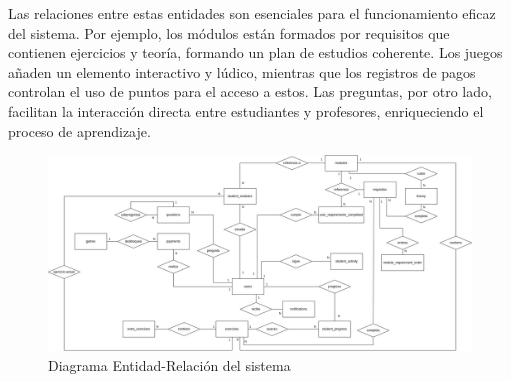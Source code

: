 Las relaciones entre estas entidades son esenciales para el funcionamiento eficaz del sistema. Por ejemplo, los módulos están formados por requisitos que contienen ejercicios y teoría, formando un plan de estudios coherente. Los juegos añaden un elemento interactivo y lúdico, mientras que los registros de pagos controlan el uso de puntos para el acceso a estos. Las preguntas, por otro lado, facilitan la interacción directa entre estudiantes y profesores, enriqueciendo el proceso de aprendizaje.

\begin{figure}[H]
    \centering
    \includegraphics[width=1.2\textwidth]{imagenes/Entidad-Relacion.jpeg}
    \caption{Diagrama Entidad-Relación del sistema}
    \label{fig:diagramaer}
\end{figure}